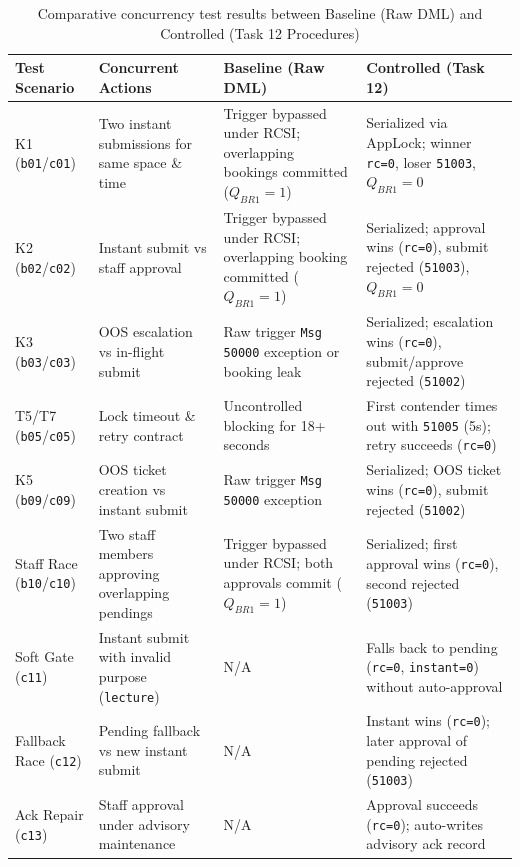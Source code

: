 \begin{table}[htbp]
    \centering
    \small
    \renewcommand{\arraystretch}{1.15}
    \begin{tabularx}{\textwidth}{p{} >{\RaggedRight\arraybackslash}X >{\RaggedRight\arraybackslash}X >{\RaggedRight\arraybackslash}p{}}
        \toprule
        \textbf{Test Scenario} & \textbf{Concurrent Actions} & \textbf{Baseline (Raw DML)} & \textbf{Controlled (Task 12)} \\
        \midrule
        K1 (\texttt{b01}/\texttt{c01}) & Two instant submissions for same space \& time & Trigger bypassed under RCSI; overlapping bookings committed ($Q_{BR1}=1$) & Serialized via AppLock; winner \texttt{rc=0}, loser \texttt{51003}, $Q_{BR1}=0$ \\
        K2 (\texttt{b02}/\texttt{c02}) & Instant submit vs staff approval & Trigger bypassed under RCSI; overlapping booking committed ($Q_{BR1}=1$) & Serialized; approval wins (\texttt{rc=0}), submit rejected (\texttt{51003}), $Q_{BR1}=0$ \\
        K3 (\texttt{b03}/\texttt{c03}) & OOS escalation vs in-flight submit & Raw trigger \texttt{Msg 50000} exception or booking leak & Serialized; escalation wins (\texttt{rc=0}), submit/approve rejected (\texttt{51002}) \\
        T5/T7 (\texttt{b05}/\texttt{c05}) & Lock timeout \& retry contract & Uncontrolled blocking for 18+ seconds & First contender times out with \texttt{51005} (5s); retry succeeds (\texttt{rc=0}) \\
        K5 (\texttt{b09}/\texttt{c09}) & OOS ticket creation vs instant submit & Raw trigger \texttt{Msg 50000} exception & Serialized; OOS ticket wins (\texttt{rc=0}), submit rejected (\texttt{51002}) \\
        Staff Race (\texttt{b10}/\texttt{c10}) & Two staff members approving overlapping pendings & Trigger bypassed under RCSI; both approvals commit ($Q_{BR1}=1$) & Serialized; first approval wins (\texttt{rc=0}), second rejected (\texttt{51003}) \\
        Soft Gate (\texttt{c11}) & Instant submit with invalid purpose (\texttt{lecture}) & N/A & Falls back to pending (\texttt{rc=0}, \texttt{instant=0}) without auto-approval \\
        Fallback Race (\texttt{c12}) & Pending fallback vs new instant submit & N/A & Instant wins (\texttt{rc=0}); later approval of pending rejected (\texttt{51003}) \\
        Ack Repair (\texttt{c13}) & Staff approval under advisory maintenance & N/A & Approval succeeds (\texttt{rc=0}); auto-writes advisory ack record \\
        \bottomrule
    \end{tabularx}
    \caption{Comparative concurrency test results between Baseline (Raw DML) and Controlled (Task 12 Procedures)}
    \label{tab:concurrency-tests}
\end{table}
\FloatBarrier

